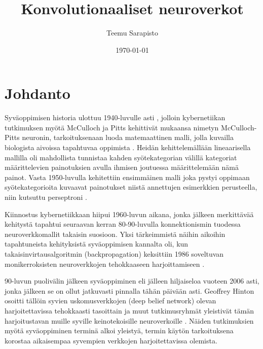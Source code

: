 \documentclass[finnish]{tktltiki2}
\title{Konvolutionaaliset neuroverkot}
\author{Teemu Sarapisto}
\date{\today}
\theoremstyle{definition}
\theoremstyle{remark}
\begin{document}

  \frontmatter      %

  \maketitle        %
  \makeabstract     %

  \tableofcontents  %


  \mainmatter       %

  \section{Johdanto}
   Syväoppimisen historia ulottuu 1940-luvulle asti \cite{Goodfellow-et-al-2016}, jolloin kybernetiikan tutkimuksen myötä McCulloch ja Pitts kehittivät mukaansa nimetyn McCulloch-Pitts neuronin, tarkoituksenaan luoda matemaattinen malli, jolla kuvailla biologista aivoissa tapahtuvaa oppimista \cite{mcculloch1943logical}. Heidän kehittelemällään lineaarisella mallilla oli mahdollista tunnistaa kahden syötekategorian välillä kategoriat määrittelevien painotuksien avulla  ihmisen joutuessa määrittelemään nämä painot. Vasta 1950-luvulla kehitettiin ensimmäinen malli joka pystyi oppimaan syötekategorioita kuvaavat painotukset niistä annettujen esimerkkien perusteella, niin kutsuttu perseptroni \cite{rosenblatt1957perceptron}.

  Kiinnostus kybernetiikkaan hiipui 1960-luvun aikana, jonka jälkeen merkittävää kehitystä tapahtui seuraavan kerran 80-90-luvulla konnektionismin tuodessa neuroverkkomallit takaisin suosioon. Yksi tärkeimmistä näihin aikoihin tapahtuneista kehityksistä syväoppimisen kannalta oli, kun takaisinvirtausalgoritmin (backpropagation) keksittiin 1986 soveltuvan monikerroksisten neuroverkkojen tehokkaaseen harjoittamiseen \cite{Rumelhart-1986-back-prop}.

  90-luvun puolivälin jälkeen syväoppiminen eli jälleen hiljaiseloa vuoteen 2006 asti, jonka jälkeen se on ollut jatkuvasti pinnalla tähän päivään asti. Geoffrey Hinton osoitti tällöin syvien uskomusverkkojen (deep belief network) olevan harjoitettavissa tehokkaasti tasoittain ja muut tutkimusryhmät yleistivät tämän harjoitustavan muille syville keinotekoisille neuroverkoille \cite{Hinton-et-al-06}. Näiden tutkimuksien myötä syväoppiminen terminä alkoi yleistyä, termin käytön tarkoituksena korostaa aikaisempaa syvempien verkkojen harjoitettavissa olemista.
\end{document}
